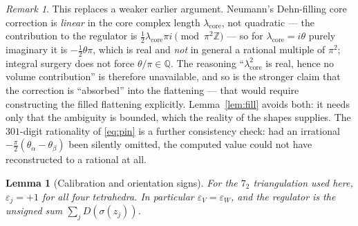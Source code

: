 \documentclass[11pt]{article}
\newtheorem{lemma}[theorem]{Lemma}
\theoremstyle{remark}
\newtheorem{remark}[theorem]{Remark}
\newcommand{\QQ}{\mathbb{Q}}
\newcommand{\ZZ}{\mathbb{Z}}
\begin{document}
\begin{remark}
This replaces a weaker earlier argument. Neumann's Dehn-filling core correction
is \emph{linear} in the core complex length $\lambda_{\mathrm{core}}$, not
quadratic --- the contribution to the regulator is
$\tfrac12\lambda_{\mathrm{core}}\pi i \pmod{\pi^2\ZZ}$ --- so for
$\lambda_{\mathrm{core}}=i\theta$ purely imaginary it is $-\tfrac12\theta\pi$,
which is real and \emph{not} in general a rational multiple of $\pi^2$; integral
surgery does not force $\theta/\pi\in\QQ$. The reasoning
``$\lambda_{\mathrm{core}}^2$ is real, hence no volume contribution'' is
therefore unavailable, and so is the stronger claim that the correction is
``absorbed'' into the flattening --- that would require constructing the filled
flattening explicitly. Lemma~\ref{lem:fill} avoids both: it needs only that the
ambiguity is bounded, which the reality of the shapes supplies. The $301$-digit
rationality of \eqref{eq:pin} is a further consistency check: had an irrational
$-\tfrac\pi2(\theta_\alpha-\theta_\beta)$ been silently omitted, the computed
value could not have reconstructed to a rational at all.
\end{remark}

\begin{lemma}[Calibration and orientation signs]\label{lem:signs}
For the $7_2$ triangulation used here, $\varepsilon_j=+1$ for all four
tetrahedra. In particular $\varepsilon_V=\varepsilon_W$, and the regulator is the
\emph{unsigned} sum $\sum_j D(\sigma(z_j))$.
\end{lemma}
\end{document}
